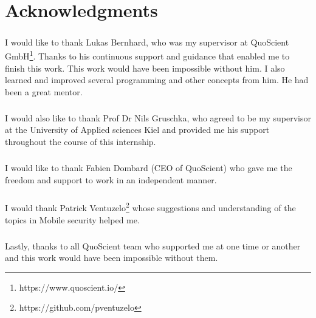 \documentclass[../main.tex]{subfile}
\begin{document}
\chapter*{Acknowledgments}

\paragraph{} I would like to thank Lukas Bernhard, who was my supervisor at QuoScient GmbH\footnote{https://www.quoscient.io/}. Thanks to his continuous support and guidance that enabled me to finish this work. This work would have been impossible without him. I also learned and improved several programming and other concepts from him. He had been a great mentor.
\paragraph{} I would also like to thank Prof Dr Nils Gruschka, who agreed to be my supervisor at the University of Applied sciences Kiel and provided me his support throughout the course of this internship.
\paragraph{} I would like to thank Fabien Dombard (CEO of QuoScient) who gave me the freedom and support to work in an independent manner.
\paragraph{} I would thank Patrick Ventuzelo\footnote{https://github.com/pventuzelo} whose suggestions and understanding of the topics in Mobile security helped me.
\paragraph{} Lastly, thanks to all QuoScient team who supported me at one time or another and this work would have been impossible without them.
\end{document}
